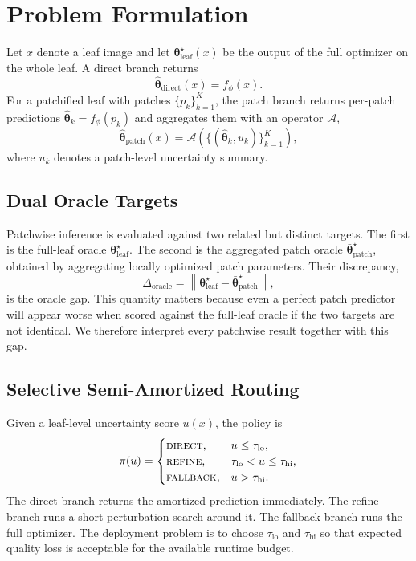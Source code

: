 \documentclass[11pt,a4paper]{article}
\newcommand{\btheta}{\boldsymbol{\theta}}
\begin{document}
\section{Problem Formulation}
Let $x$ denote a leaf image and let $\btheta^{\star}_{\mathrm{leaf}}(x)$ be the output of the full optimizer on the whole leaf.
A direct branch returns
\begin{equation}
\hat{\btheta}_{\mathrm{direct}}(x)=f_\phi(x).
\end{equation}
For a patchified leaf with patches $\{p_k\}_{k=1}^{K}$, the patch branch returns per-patch predictions $\hat{\btheta}_k=f_\phi(p_k)$ and aggregates them with an operator $\mathcal{A}$,
\begin{equation}
\hat{\btheta}_{\mathrm{patch}}(x)=\mathcal{A}\left(\{(\hat{\btheta}_k,u_k)\}_{k=1}^{K}\right),
\end{equation}
where $u_k$ denotes a patch-level uncertainty summary.

\subsection{Dual Oracle Targets}
Patchwise inference is evaluated against two related but distinct targets.
The first is the full-leaf oracle $\btheta^{\star}_{\mathrm{leaf}}$.
The second is the aggregated patch oracle $\bar{\btheta}^{\star}_{\mathrm{patch}}$, obtained by aggregating locally optimized patch parameters.
Their discrepancy,
\begin{equation}
\Delta_{\mathrm{oracle}}=\left\lVert \btheta^{\star}_{\mathrm{leaf}}-\bar{\btheta}^{\star}_{\mathrm{patch}}\right\rVert,
\end{equation}
is the oracle gap.
This quantity matters because even a perfect patch predictor will appear worse when scored against the full-leaf oracle if the two targets are not identical.
We therefore interpret every patchwise result together with this gap.

\subsection{Selective Semi-Amortized Routing}
Given a leaf-level uncertainty score $u(x)$, the policy is
\begin{equation}
\pi(u)=
\begin{cases}
\textsc{direct}, & u\le \tau_{\mathrm{lo}},\\
\textsc{refine}, & \tau_{\mathrm{lo}}<u\le \tau_{\mathrm{hi}},\\
\textsc{fallback}, & u>\tau_{\mathrm{hi}}.
\end{cases}
\label{eq:routing}
\end{equation}
The direct branch returns the amortized prediction immediately.
The refine branch runs a short perturbation search around it.
The fallback branch runs the full optimizer.
The deployment problem is to choose $\tau_{\mathrm{lo}}$ and $\tau_{\mathrm{hi}}$ so that expected quality loss is acceptable for the available runtime budget.
\end{document}
